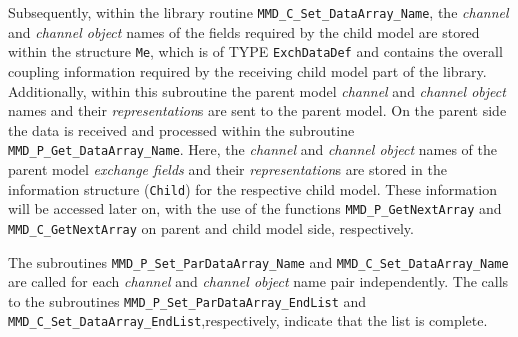 \documentclass[twoside]{article}
\begin{document}
\begin{itemize}
Subsequently, within the library
routine \verb|MMD_C_Set_DataArray_Name|, the {\it channel} and {\it
channel object} names of the fields required by the child model are  
stored within the structure \verb|Me|, which is of TYPE \verb|ExchDataDef|
and contains the overall coupling information required by the
receiving child model part of the library.
Additionally, within this subroutine the parent model {\it channel} and
 {\it channel object} names and their {\it representation}s 
are sent to the parent model. On the parent side the data is received
 and processed within the
 subroutine \verb|MMD_P_Get_DataArray_Name|. Here, the 
{\it channel} and {\it channel object} names of the parent model {\it exchange
fields} 
 and their {\it representation}s are stored in the information structure 
(\verb|Child|) for the respective child model. 
These information will be accessed later on, with the use of the functions
 \verb|MMD_P_GetNextArray| and \verb|MMD_C_GetNextArray| on parent and
 child model side, respectively.  

The subroutines \verb|MMD_P_Set_ParDataArray_Name|
and \verb|MMD_C_Set_DataArray_Name| are called for each {\it
channel} and {\it channel object} name pair independently. The calls to
the subroutines \verb|MMD_P_Set_ParDataArray_EndList|
and \verb|MMD_C_Set_DataArray_EndList|,respectively, indicate that the list
is complete.


\end{itemize}
\end{document}
